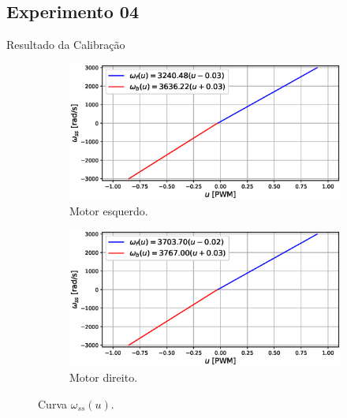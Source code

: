 \subsection{Experimento 04}
\begin{frame}{Resultado da Calibração}

\begin{figure}
    \begin{subfigure}{.45\textwidth}
    \centering
        \includegraphics[width=\textwidth]{figuras/resultados/exp04/curva_feedforward_esquerdo100.eps}
        \caption{Motor esquerdo.}
    \end{subfigure}
    \begin{subfigure}{.45\textwidth}
        \centering
        \includegraphics[width=\textwidth]{figuras/resultados/exp04/curva_feedforward_direito100.eps}
        \caption{Motor direito.}
    \end{subfigure}
    \caption{Curva $\omega_{ss}(u)$.}
\end{figure}

\end{frame}

